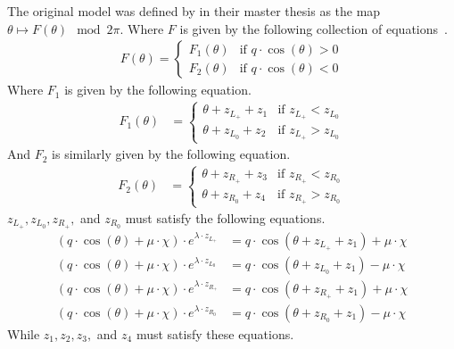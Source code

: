 The original model was defined by  in their master thesis as the map $\theta \mapsto F(\theta) \mod 2 \pi$.
Where $F$ is given by the following collection of equations~\cite{akyuz2022}.
\begin{align}
	F(\theta) = \begin{cases}
		            F_1(\theta) & \text{if } q \cdot \cos(\theta) > 0 \\
		            F_2(\theta) & \text{if } q \cdot \cos(\theta) < 0
	            \end{cases}
\end{align}
Where $F_1$ is given by the following equation.
\begin{align}
	F_1(\theta) & = \begin{cases}
		                \theta + z_{L_+} + z_1 & \text{if } z_{L_+} < z_{L_0} \\
		                \theta + z_{L_0} + z_2 & \text{if } z_{L_+} > z_{L_0}
	                \end{cases}
\end{align}
And $F_2$ is similarly given by the following equation.
\begin{align}
	F_2(\theta) & = \begin{cases}
		                \theta + z_{R_+} + z_3 & \text{if } z_{R_+} < z_{R_0} \\
		                \theta + z_{R_0} + z_4 & \text{if } z_{R_+} > z_{R_0}
	                \end{cases}
\end{align}
$z_{L_+}, z_{L_0}, z_{R_+},$ and $z_{R_0}$ must satisfy the following equations.
\begin{subequations}
	\begin{align}
		(q \cdot \cos(\theta) + \mu \cdot \chi) \cdot e^{\lambda \cdot z_{L_+}}
		 & = q \cdot \cos(\theta + z_{L_+} + z_1) + \mu \cdot \chi \\
		(q \cdot \cos(\theta) + \mu \cdot \chi) \cdot e^{\lambda \cdot z_{L_0}}
		 & = q \cdot \cos(\theta + z_{L_0} + z_1) - \mu \cdot \chi \\
		(q \cdot \cos(\theta) + \mu \cdot \chi) \cdot e^{\lambda \cdot z_{R_+}}
		 & = q \cdot \cos(\theta + z_{R_+} + z_1) + \mu \cdot \chi \\
		(q \cdot \cos(\theta) + \mu \cdot \chi) \cdot e^{\lambda \cdot z_{R_0}}
		 & = q \cdot \cos(\theta + z_{R_0} + z_1) - \mu \cdot \chi
	\end{align}
\end{subequations}
While $z_1, z_2, z_3,$ and $z_4$ must satisfy these equations.
